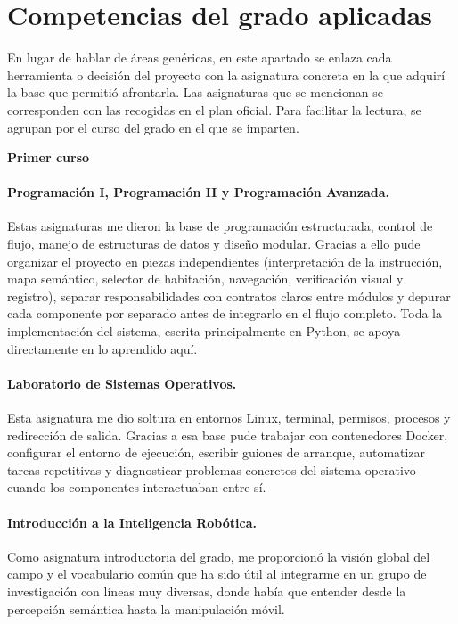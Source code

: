 \documentclass[11pt,fleqn,openany]{book} %
\newcommand{\cursoTitulo}[1]{%
  \par\addvspace{14pt}%
  {\sffamily\bfseries\large\color{ocre}#1}%
  \par\vspace{1pt}%
  \noindent{\color{ocre!60}\rule{\linewidth}{0.4pt}}%
  \par\addvspace{4pt}%
}
\begin{document}
\section{Competencias del grado aplicadas}

En lugar de hablar de áreas genéricas, en este apartado se enlaza cada herramienta o decisión del proyecto con la asignatura concreta en la que adquirí la base que permitió afrontarla. Las asignaturas que se mencionan se corresponden con las recogidas en el plan oficial. Para facilitar la lectura, se agrupan por el curso del grado en el que se imparten.

\cursoTitulo{Primer curso}

\paragraph{Programación I, Programación II y Programación Avanzada.} Estas asignaturas me dieron la base de programación estructurada, control de flujo, manejo de estructuras de datos y diseño modular. Gracias a ello pude organizar el proyecto en piezas independientes (interpretación de la instrucción, mapa semántico, selector de habitación, navegación, verificación visual y registro), separar responsabilidades con contratos claros entre módulos y depurar cada componente por separado antes de integrarlo en el flujo completo. Toda la implementación del sistema, escrita principalmente en Python, se apoya directamente en lo aprendido aquí.

\paragraph{Laboratorio de Sistemas Operativos.} Esta asignatura me dio soltura en entornos Linux, terminal, permisos, procesos y redirección de salida. Gracias a esa base pude trabajar con contenedores Docker, configurar el entorno de ejecución, escribir guiones de arranque, automatizar tareas repetitivas y diagnosticar problemas concretos del sistema operativo cuando los componentes interactuaban entre sí.

\paragraph{Introducción a la Inteligencia Robótica.} Como asignatura introductoria del grado, me proporcionó la visión global del campo y el vocabulario común que ha sido útil al integrarme en un grupo de investigación con líneas muy diversas, donde había que entender desde la percepción semántica hasta la manipulación móvil.
\end{document}
